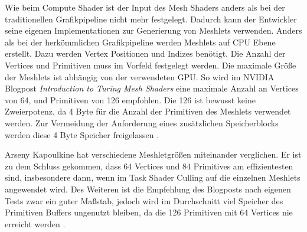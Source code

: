 Wie beim Compute Shader ist der Input des Mesh Shaders anders als bei der traditionellen Grafikpipeline nicht mehr festgelegt.
Dadurch kann der Entwickler seine eigenen Implementationen zur Generierung von Meshlets verwenden.
Anders als bei der herkömmlichen Grafikpipeline werden Meshlets auf CPU Ebene erstellt.
Dazu werden Vertex Positionen und Indizes benötigt.
Die Anzahl der Vertices und Primitiven muss im Vorfeld festgelegt werden.
Die maximale Größe der Meshlets ist abhängig von der verwendeten GPU.
So wird im NVIDIA Blogpost \textit{Introduction to Turing Mesh Shaders} eine maximale Anzahl an Vertices von 64, und Primitiven von 126 empfohlen.
Die 126 ist bewusst keine Zweierpotenz, da 4 Byte für die Anzahl der Primitiven des Meshlets verwendet werden.
Zur Vermeidung der Anforderung eines zusätzlichen Speicherblocks werden diese 4 Byte Speicher freigelassen \cite{Kubisch2018}. \newline

Arseny Kapoulkine hat verschiedene Meshletgrößen miteinander verglichen.
Er ist zu dem Schluss gekommen, dass 64 Vertices und 84 Primitives am effizientesten sind, insbesondere dann, wenn im Task Shader Culling auf die einzelnen Meshlets angewendet wird.
Des Weiteren ist die Empfehlung des Blogposts nach eigenen Tests zwar ein guter Maßstab, jedoch wird im Durchschnitt viel Speicher des Primitiven Buffers ungenutzt bleiben, da die 126 Primitiven mit 64 Vertices nie erreicht werden \cite{Kapoulkine2023}.

